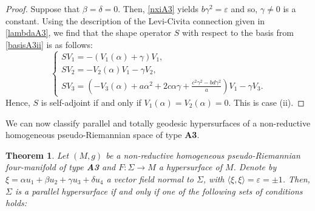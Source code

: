 \documentclass{amsart}
\theoremstyle{plain}
\newtheorem{theorem}{Theorem}
\theoremstyle{remark}
\begin{document}
{\begin{proof}
Suppose that $\beta=\delta=0$. Then, \eqref{nxiA3} yields $b\gamma^2 = \varepsilon$ and so, $\gamma \neq 0$ is a constant. 
Using the description of the Levi-Civita connection given in \eqref{lambdaA3}, we find that the shape operator $S$ with respect to the basis from \eqref{basisA3ii} is as follows:
\begin{equation}\label{sA3ii}
\left\{
\begin{array}{l}
SV_1 =  -(V_1(\alpha)+\gamma) V_1, \\[2 pt]
SV_2 =  -V_2(\alpha)V_1 - \gamma V_2, \\[2 pt]
SV_3 =  \left(-V_3(\alpha) + a\alpha^2+2c\alpha\gamma + \frac{c^2\gamma^2-bd\gamma^2}{a}\right)V_1 - \gamma V_3.
\end{array}
\right.
\end{equation}
%
%
Hence, $S$ is self-adjoint if and only if $V_1(\alpha)=V_2(\alpha)=0$. This is case (ii).
\end{proof}

We can now classify parallel and totally geodesic hypersurfaces of a non-reductive homogeneous pseudo-Riemannian space of type \textbf{A3}. 

\begin{theorem}\label{parA3}
Let $(M,g)$ be a non-reductive homogeneous pseudo-Riemannian four-manifold of type {\rm\bf A3} and $F : \Sigma \to M$ a hypersurface of $M$. Denote by $\xi=\alpha u_1+\beta u_2+\gamma u_3+\delta u_4$ a vector field normal to $\Sigma$, with $\langle \xi ,\xi \rangle=\varepsilon=\pm 1$. Then, $\Sigma$ is a parallel hypersurface if and only if one of the following sets of conditions holds:
%
\begin{itemize}


\end{itemize}
\end{theorem}}
\end{document}

